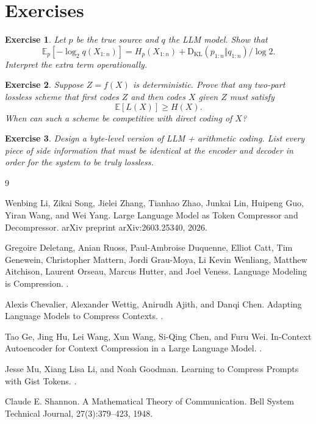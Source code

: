\documentclass[11pt]{article}
\newtheorem{exercise}{Exercise}
\theoremstyle{remark}
\newcommand{\E}{\mathbb{E}}
\newcommand{\KL}{\mathrm{D_{KL}}}
\begin{document}
\section{Exercises}

\begin{exercise}
Let $p$ be the true source and $q$ the LLM model. Show that
\[
\E_p[-\log_2 q(X_{1:n})] = H_p(X_{1:n}) + \KL(p_{1:n}\Vert q_{1:n})/\log 2.
\]
Interpret the extra term operationally.
\end{exercise}

\begin{exercise}
Suppose $Z=f(X)$ is deterministic. Prove that any two-part lossless scheme that first codes $Z$ and then codes $X$ given $Z$ must satisfy
\[
\E[L(X)] \ge H(X).
\]
When can such a scheme be competitive with direct coding of $X$?
\end{exercise}

\begin{exercise}
Design a byte-level version of LLM + arithmetic coding. List every piece of side information that must be identical at the encoder and decoder in order for the system to be truly lossless.
\end{exercise}

\begin{thebibliography}{9}

Wenbing Li, Zikai Song, Jielei Zhang, Tianhao Zhao, Junkai Lin, Huipeng Guo, Yiran Wang, and Wei Yang.
\newblock Large Language Model as Token Compressor and Decompressor.
\newblock arXiv preprint arXiv:2603.25340, 2026.

Gregoire Deletang, Anian Ruoss, Paul-Ambroise Duquenne, Elliot Catt, Tim Genewein, Christopher Mattern, Jordi Grau-Moya, Li Kevin Wenliang, Matthew Aitchison, Laurent Orseau, Marcus Hutter, and Joel Veness.
\newblock Language Modeling is Compression.
.

Alexis Chevalier, Alexander Wettig, Anirudh Ajith, and Danqi Chen.
\newblock Adapting Language Models to Compress Contexts.
.

Tao Ge, Jing Hu, Lei Wang, Xun Wang, Si-Qing Chen, and Furu Wei.
\newblock In-Context Autoencoder for Context Compression in a Large Language Model.
.

Jesse Mu, Xiang Lisa Li, and Noah Goodman.
\newblock Learning to Compress Prompts with Gist Tokens.
.

Claude E. Shannon.
\newblock A Mathematical Theory of Communication.
\newblock Bell System Technical Journal, 27(3):379--423, 1948.

\end{thebibliography}
\end{document}
